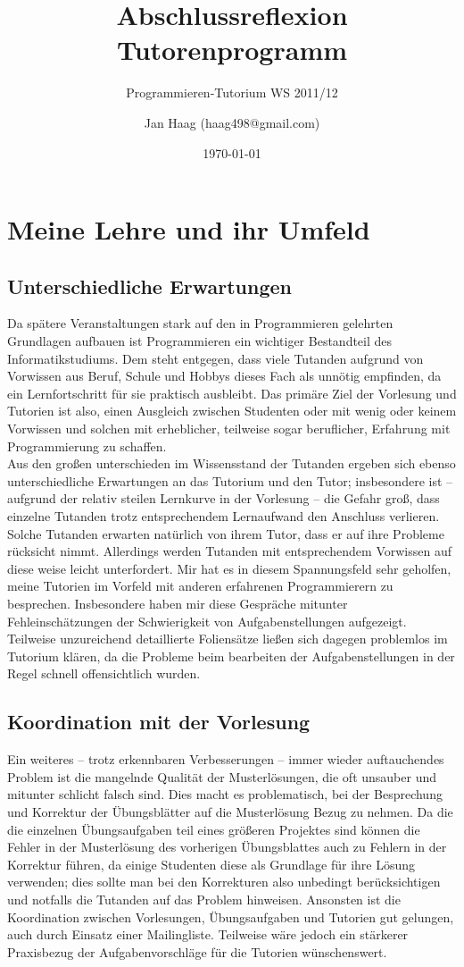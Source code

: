 \documentclass[%
fontsize=12pt,
paper=a4,
oneside,
DIV=13,
BCOR=0cm,
pagesize=automedia,
parskip=false,
headings=normal,
titlepage=true%
]{scrartcl}
\author{Jan Haag (haag498@gmail.com)}
\title{Abschlussreflexion Tutorenprogramm}
\subtitle{Programmieren-Tutorium WS 2011/12}
\date{\today}
\begin{document}
\maketitle
\section{Meine Lehre und ihr Umfeld}
\subsection{Unterschiedliche Erwartungen}
Da sp\"atere Veranstaltungen stark auf den in Programmieren gelehrten Grundlagen
aufbauen
ist Programmieren ein wichtiger Bestandteil des Informatikstudiums.
Dem steht entgegen, dass viele Tutanden aufgrund von Vorwissen
aus Beruf, Schule und Hobbys dieses Fach als unn\"otig empfinden,
da ein Lernfortschritt f\"ur sie praktisch ausbleibt.
Das prim\"are Ziel der Vorlesung und Tutorien ist also,
einen Ausgleich zwischen Studenten oder mit wenig oder keinem Vorwissen und
solchen mit erheblicher,
teilweise sogar beruflicher, Erfahrung mit Programmierung zu schaffen.\\
Aus den gro\ss{}en unterschieden im Wissensstand der Tutanden ergeben sich
ebenso unterschiedliche
Erwartungen an das Tutorium und den Tutor; insbesondere ist -- aufgrund der
relativ steilen Lernkurve in
der Vorlesung -- die Gefahr gro\ss{}, dass einzelne Tutanden trotz
entsprechendem Lernaufwand den Anschluss
verlieren. Solche Tutanden erwarten nat\"urlich von ihrem Tutor, dass er auf
ihre Probleme r\"ucksicht
nimmt. Allerdings werden Tutanden mit entsprechendem Vorwissen auf diese weise
leicht unterfordert.
Mir hat es in diesem Spannungsfeld sehr geholfen, meine Tutorien im Vorfeld mit
anderen erfahrenen Programmierern
zu besprechen. Insbesondere haben mir diese Gespr\"ache mitunter
Fehleinsch\"atzungen der Schwierigkeit von
Aufgabenstellungen aufgezeigt. Teilweise unzureichend detaillierte
Foliens\"atze lie\ss{}en sich dagegen problemlos
im Tutorium kl\"aren, da die Probleme beim bearbeiten der Aufgabenstellungen
in der Regel schnell offensichtlich
wurden.
\subsection{Koordination mit der Vorlesung}
Ein weiteres -- trotz erkennbaren Verbesserungen --
immer wieder auftauchendes Problem ist die mangelnde Qualit\"at der
Musterl\"osungen, die oft
unsauber und mitunter schlicht falsch sind. Dies macht es problematisch, bei der
Besprechung und Korrektur
der \"Ubungsbl\"atter auf die Musterl\"osung Bezug zu nehmen. Da die die
einzelnen \"Ubungsaufgaben
teil eines gr\"o\ss{}eren Projektes sind k\"onnen die Fehler in der
Musterl\"osung des vorherigen \"Ubungsblattes
auch zu Fehlern in der Korrektur f\"uhren, da einige Studenten diese als
Grundlage f\"ur ihre L\"osung verwenden;
dies sollte man bei den Korrekturen also unbedingt ber\"ucksichtigen und
notfalls die Tutanden auf das Problem hinweisen.
Ansonsten ist die Koordination zwischen Vorlesungen, \"Ubungsaufgaben und
Tutorien gut gelungen, auch durch Einsatz einer
Mailingliste. Teilweise w\"are jedoch ein st\"arkerer Praxisbezug der
Aufgabenvorschl\"age f\"ur die Tutorien
w\"unschenswert.
\end{document}
